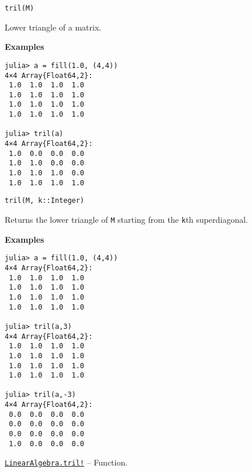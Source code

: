 \begin{adjustwidth}{2em}{0pt}


\begin{verbatim}
tril(M)
\end{verbatim}

Lower triangle of a matrix.

\textbf{Examples}


\begin{verbatim}
julia> a = fill(1.0, (4,4))
4×4 Array{Float64,2}:
 1.0  1.0  1.0  1.0
 1.0  1.0  1.0  1.0
 1.0  1.0  1.0  1.0
 1.0  1.0  1.0  1.0

julia> tril(a)
4×4 Array{Float64,2}:
 1.0  0.0  0.0  0.0
 1.0  1.0  0.0  0.0
 1.0  1.0  1.0  0.0
 1.0  1.0  1.0  1.0
\end{verbatim}




\begin{lstlisting}
tril(M, k::Integer)
\end{lstlisting}

Returns the lower triangle of \texttt{M} starting from the \texttt{k}th superdiagonal.

\textbf{Examples}


\begin{verbatim}
julia> a = fill(1.0, (4,4))
4×4 Array{Float64,2}:
 1.0  1.0  1.0  1.0
 1.0  1.0  1.0  1.0
 1.0  1.0  1.0  1.0
 1.0  1.0  1.0  1.0

julia> tril(a,3)
4×4 Array{Float64,2}:
 1.0  1.0  1.0  1.0
 1.0  1.0  1.0  1.0
 1.0  1.0  1.0  1.0
 1.0  1.0  1.0  1.0

julia> tril(a,-3)
4×4 Array{Float64,2}:
 0.0  0.0  0.0  0.0
 0.0  0.0  0.0  0.0
 0.0  0.0  0.0  0.0
 1.0  0.0  0.0  0.0
\end{verbatim}



\end{adjustwidth}
\hypertarget{579033117422555588}{} 
\hyperlink{579033117422555588}{\texttt{LinearAlgebra.tril!}}  -- {Function.}

